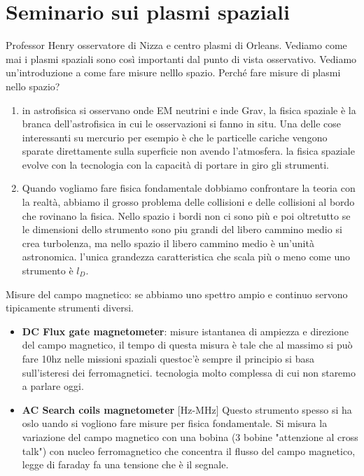 \documentclass{book}
\begin{document}
\newpage

\chapter{Seminario sui plasmi spaziali} 
Professor Henry osservatore di Nizza e centro plasmi di Orleans. Vediamo come mai i plasmi spaziali sono così importanti dal punto di vista osservativo.
Vediamo un'introduzione a come fare misure nelllo spazio. Perché fare misure di plasmi nello spazio? \begin{enumerate}
    \item in astrofisica si osservano onde EM neutrini e inde Grav, la fisica spaziale è la branca dell'astrofisica in cui le osservazioni si fanno in situ. Una delle cose interessanti su mercurio per esempio è che le particelle cariche vengono sparate direttamente sulla superficie non avendo l'atmosfera. la fisica spaziale evolve con la tecnologia con la capacità di portare in giro gli strumenti. 
    \item Quando vogliamo fare fisica fondamentale dobbiamo confrontare la teoria con la realtà, abbiamo il grosso problema delle collisioni e delle collisioni al bordo che rovinano la fisica. Nello spazio i bordi non ci sono più e poi oltretutto se le dimensioni dello strumento sono piu grandi del libero cammino medio si crea turbolenza, ma nello spazio il libero cammino medio è un'unità astronomica. l'unica grandezza caratteristica che scala più o meno come uno strumento è $l_D$.  


\end{enumerate}  
Misure del campo magnetico: se abbiamo uno spettro ampio e continuo servono tipicamente strumenti diversi. \begin{itemize}
    \item \textbf{DC Flux gate magnetometer}: misure istantanea di ampiezza e direzione del campo magnetico, il tempo di questa misura è tale che al massimo si può fare 10hz nelle missioni spaziali questoc'è sempre il principio si basa sull'isteresi dei ferromagnetici. tecnologia molto complessa di cui non staremo a parlare oggi.
    \item \textbf{AC Search coils magnetometer} [Hz-MHz] Questo strumento spesso si ha oslo uando si vogliono fare misure per fisica fondamentale. Si misura la variazione del campo magnetico con una bobina (3 bobine "attenzione al cross talk") con nucleo ferromagnetico che concentra il flusso del campo magnetico, legge di faraday fa una tensione che è il segnale.  


\end{itemize} 
\end{document}
